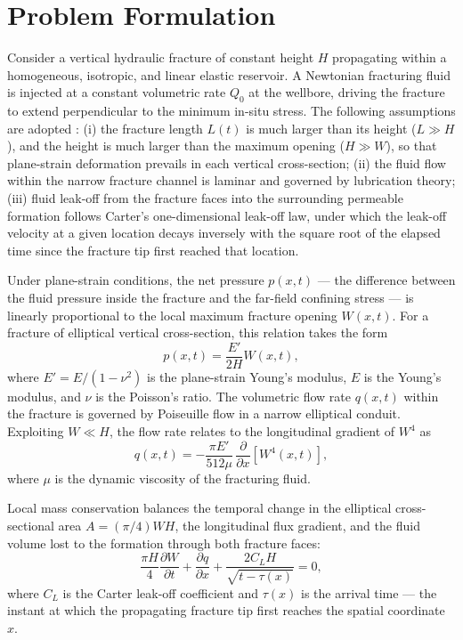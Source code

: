 \documentclass[a4paper,fleqn]{cas-sc}
\begin{document}
\section{Problem Formulation}\label{sec:problem}

Consider a vertical hydraulic fracture of constant height $H$
propagating within a homogeneous, isotropic, and linear elastic
reservoir. A Newtonian fracturing fluid is injected at a constant
volumetric rate $Q_0$ at the wellbore, driving the fracture to extend
perpendicular to the minimum in-situ stress. The following assumptions
are adopted \cite{Nordgren1972,Detournay2016}: (i) the fracture length
$L(t)$ is much larger than its height ($L \gg H$), and the height is
much larger than the maximum opening ($H \gg W$), so that plane-strain
deformation prevails in each vertical cross-section; (ii) the fluid
flow within the narrow fracture channel is laminar and governed by
lubrication theory; (iii) fluid leak-off from the fracture faces into
the surrounding permeable formation follows Carter's one-dimensional
leak-off law, under which the leak-off velocity at a given location
decays inversely with the square root of the elapsed time since the
fracture tip first reached that location.

Under plane-strain conditions, the net pressure $p(x,t)$ --- the
difference between the fluid pressure inside the fracture and the
far-field confining stress --- is linearly proportional to the local
maximum fracture opening $W(x,t)$. For a fracture of elliptical
vertical cross-section, this relation takes the form
\cite{Nordgren1972}
\begin{equation}
  p(x,t) = \frac{E'}{2H} W(x,t),
  \label{eq:elasticity}
\end{equation}
where $E' = E/(1-\nu^2)$ is the plane-strain Young's modulus, $E$ is
the Young's modulus, and $\nu$ is the Poisson's ratio. The volumetric
flow rate $q(x,t)$ within the fracture is governed by Poiseuille flow
in a narrow elliptical conduit. Exploiting $W \ll H$, the flow rate
relates to the longitudinal gradient of $W^4$ as
\cite{Nordgren1972,Kemp1990}
\begin{equation}
  q(x,t) = -\frac{\pi E'}{512 \mu}\,
           \frac{\partial}{\partial x}\!\left[W^4(x,t)\right],
  \label{eq:flow}
\end{equation}
where $\mu$ is the dynamic viscosity of the fracturing fluid.

Local mass conservation balances the temporal change in the elliptical
cross-sectional area $A = (\pi/4)WH$, the longitudinal flux gradient,
and the fluid volume lost to the formation through both fracture faces:
\begin{equation}
  \frac{\pi H}{4}\frac{\partial W}{\partial t}
  + \frac{\partial q}{\partial x}
  + \frac{2 C_L H}{\sqrt{t - \tau(x)}} = 0,
  \label{eq:continuity}
\end{equation}
where $C_L$ is the Carter leak-off coefficient and $\tau(x)$ is the
arrival time --- the instant at which the propagating fracture tip first
reaches the spatial coordinate $x$.
\end{document}
